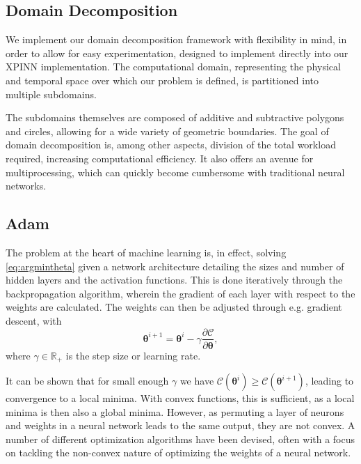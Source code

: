 \subsection{Domain Decomposition}
We implement our domain decomposition framework with flexibility in mind, in order to allow for easy experimentation, designed to implement directly into our XPINN implementation.
The computational domain, representing the physical and temporal space over which our problem is defined, is partitioned into multiple subdomains.

The subdomains themselves are composed of additive and subtractive polygons and circles, allowing for a wide variety of geometric boundaries.
The goal of domain decomposition is, among other aspects, division of the total workload required, increasing computational efficiency.
It also offers an avenue for multiprocessing, which can quickly become cumbersome with traditional neural networks.

\subsection{Adam}
The problem at the heart of machine learning is, in effect, solving \eqref{eq:argmintheta} given a network architecture detailing the sizes and number of hidden layers and the activation functions.
This is done iteratively through the backpropagation algorithm, wherein the gradient of each layer with respect to the weights are calculated.
The weights can then be adjusted through e.g. gradient descent, with
\begin{equation}\label{eq:backprop}
    \boldsymbol{\theta}^{i+1} = \boldsymbol{\theta}^i - \gamma \frac{\partial \mathcal{C}}{\partial \boldsymbol{\theta}},
\end{equation}
where $\gamma \in \mathbb{R}_{+}$ is the step size or learning rate.

It can be shown that for small enough $\gamma$ we have $\mathcal{C}(\boldsymbol{\theta}^i) \geq \mathcal{C}(\boldsymbol{\theta}^{i+1})$, leading to convergence to a local minima.
With convex functions, this is sufficient, as a local minima is then also a global minima.
However, as permuting a layer of neurons and weights in a neural network leads to the same output, they are not convex.
A number of different optimization algorithms have been devised, often with a focus on tackling the non-convex nature of optimizing the weights of a neural network.

